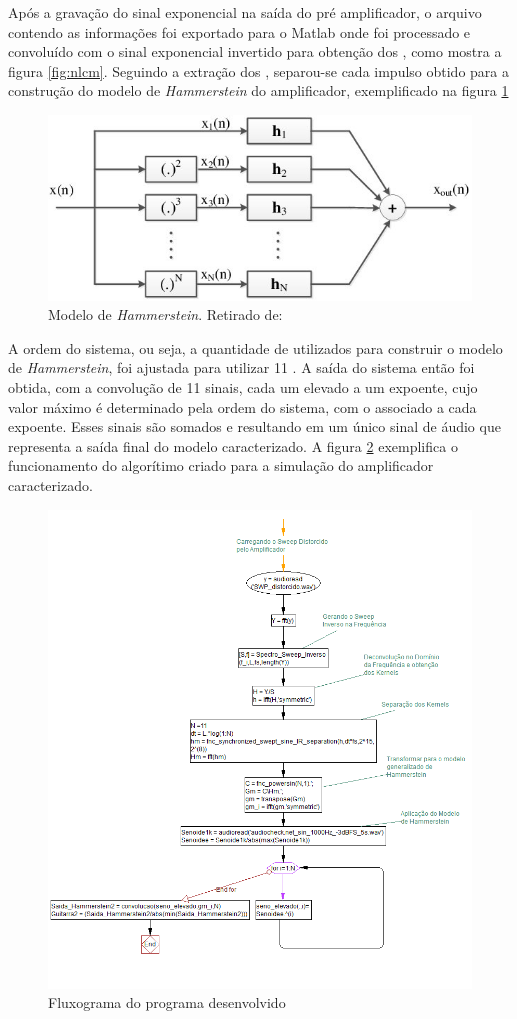 Após a gravação do sinal exponencial na saída do pré amplificador, o arquivo contendo as informações foi exportado para o Matlab onde foi processado e convoluído com o sinal exponencial invertido para obtenção dos , como mostra a figura \ref{fig:nlcm}. Seguindo a extração dos , separou-se cada impulso obtido para a construção do modelo de \textit{Hammerstein} do amplificador, exemplificado na figura \ref{fig:hammer}


\begin{figure}
	\centering
	\includegraphics[width=0.5\linewidth]{figuras/hammer}
	\caption{Modelo de \textit{Hammerstein}. Retirado de: \cite{inproceedings}}
	\label{fig:hammer}
\end{figure}

\pagebreak
A ordem do sistema, ou seja, a quantidade de  utilizados para construir o modelo de \textit{Hammerstein}, foi ajustada para utilizar 11 . A saída do sistema então foi obtida, com a convolução de 11 sinais, cada um elevado a um expoente, cujo valor máximo é determinado pela ordem do sistema, com o  associado a cada expoente. Esses sinais são somados e resultando em um único sinal de áudio que representa a saída final do modelo caracterizado. A figura \ref{fig:diagramamatlab} exemplifica o funcionamento do algorítimo criado para a simulação do amplificador caracterizado.


\begin{figure}[!htb]

	\includegraphics[width=1.0\linewidth]{figuras/Diagrama_Matlab}
	\caption{Fluxograma do programa desenvolvido}
	\label{fig:diagramamatlab}
\end{figure}
